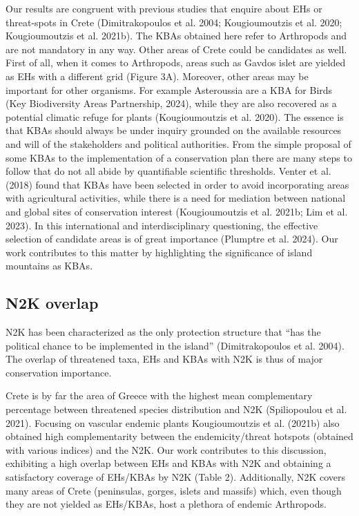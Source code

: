 Our results are congruent with previous studies that enquire about EHs or
threat-spots in Crete (Dimitrakopoulos et al. 2004; Kougioumoutzis et al. 2020; Kougioumoutzis et al. 2021b).
The KBAs obtained here refer to Arthropods and are not mandatory in any way.
Other areas of Crete could be candidates as well. First of all, when it comes to
Arthropods, areas such as Gavdos islet are yielded as EHs with a different grid (Figure 3A).
Moreover, other areas may be important for other organisms. For example Asteroussia
are a KBA for Birds (Key Biodiversity Areas Partnership, 2024), while they are
also recovered as a potential climatic refuge for plants (Kougioumoutzis et al. 2020).
The essence is that KBAs should always be under inquiry grounded on the available
resources and will of the stakeholders and political authorities. From the
simple proposal of some KBAs to the implementation of a conservation plan there
are many steps to follow that do not all abide by quantifiable scientific
thresholds. Venter et al. (2018) found that KBAs have been selected in order to
avoid incorporating areas with agricultural activities, while there is a need
for mediation between national and global sites of conservation
interest (Kougioumoutzis et al. 2021b; Lim et al. 2023). In this international
and interdisciplinary questioning, the effective selection of candidate areas
is of great importance (Plumptre et al. 2024). Our work contributes to this
matter by highlighting the significance of island mountains as KBAs.

    \subsection{N2K overlap}
    \label{subsec:arthropods-N2K-overlap}

N2K has been characterized as the only protection structure that “has the
political chance to be implemented in the island” (Dimitrakopoulos et al. 2004).
The overlap of threatened taxa, EHs and KBAs with N2K is thus of major
conservation importance. 

Crete is by far the area of Greece with the highest mean complementary
percentage between threatened species distribution and N2K (Spiliopoulou et al. 2021).
Focusing on vascular endemic plants Kougioumoutzis et al. (2021b) also obtained
high complementarity between the endemicity/threat hotspots
(obtained with various indices) and the N2K. Our work contributes to this
discussion, exhibiting a high overlap between EHs and KBAs with N2K and
obtaining a satisfactory coverage of  EHs/KBAs by N2K (Table 2).
Additionally, N2K covers many areas of Crete (peninsulas, gorges, islets and
massifs) which, even though they are not yielded as EHs/KBAs, host a plethora
of endemic Arthropods.

